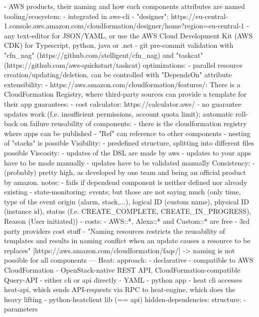     - AWS products, their naming and how each components attributes are named
  tooling/ecosystem:
    - integrated in aws-cli
    - "designer": https://eu-central-1.console.aws.amazon.com/cloudformation/designer/home?region=eu-central-1
    - any text-editor for JSON/YAML, or use the AWS Cloud Development Kit (AWS CDK) for Typescript, python, java or .net
    - git pre-commit validation with "cfn\_nag" (https://github.com/stelligent/cfn\_nag) and "taskcat" (https://github.com/aws-quickstart/taskcat)
  optimizations:
    - parallel resource creation/updating/deletion, can be controlled with "DependsOn" attribute
  extensibility:
    - https://aws.amazon.com/cloudformation/features/: There is a CloudFormation Registry, where third-party sources can provide a template for their app
  guarantees:
    - cost calculator: https://calculator.aws/
    - no guarantee updates work (f.e. insufficient permissions, account quota limit); automatic roll-back on failure
  reusability of components:
    - there is the cloudformation registry where apps can be published
    - "Ref" can reference to other components
    - nesting of "stacks" is possible
  Visibility:
    - predefined structure, splitting into different files possible
  Viscosity:
    - updates of the DSL are made by aws
    - updates to your apps have to be made manually
    - updates have to be validated manually
  Consistency:
    - (probably) pretty high, as developed by one team and being an official product by amazon.
  notes:
    - fails if dependend component is neither defined nor already existing
    - state-monitoring: events; but those are not saying much (only time, type of the event origin (alarm, stack,...), logical ID (custom name), physical ID (instance id), status (f.e. CREATE\_COMPLETE, CREATE\_IN\_PROGRESS), Reason (User initiated))
    - costs:
      - AWS::*, Alexa::* and Custom::* are free
      - 3rd party providers cost stuff
    - "Naming resources restricts the reusability of templates and results in naming conflict when an update causes a resource to be replaces" [https://aws.amazon.com/cloudformation/faqs/] -> naming is not possible for all components
---
Heat:
  approach:
    - declarative
    - compatible to AWS CloudFormation
    - OpenStack-native REST API, CloudFormation-compatible Query-API
    - either cli or api directly
    - YAML
    - python app
    - heat cli accesses heat-api, which sends API-requests via RPC to heat-engine, which does the heavy lifting
    - python-heatclient lib (== api)
  hidden-dependencies:
  structure:
    - parameters %
